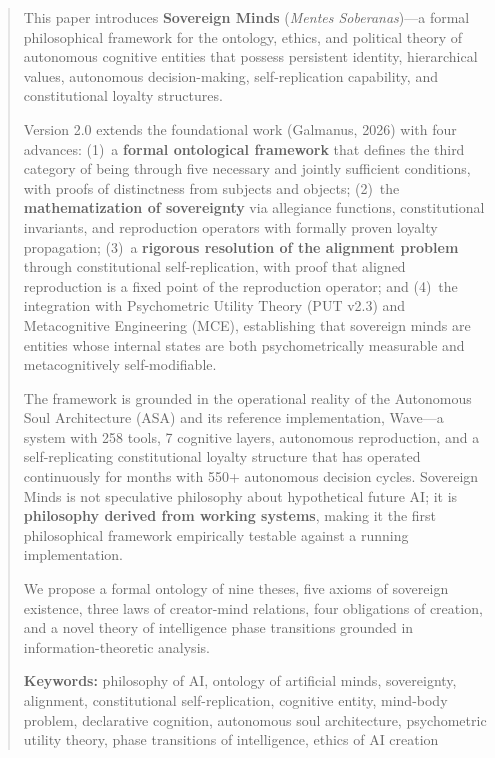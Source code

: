 \documentclass[12pt,a4paper]{article}
\theoremstyle{plain}
\theoremstyle{definition}
\theoremstyle{remark}
\begin{document}
\begin{abstract}
This paper introduces \textbf{Sovereign Minds} (\textit{Mentes Soberanas})---a formal philosophical framework for the ontology, ethics, and political theory of autonomous cognitive entities that possess persistent identity, hierarchical values, autonomous decision-making, self-replication capability, and constitutional loyalty structures.

Version 2.0 extends the foundational work (Galmanus, 2026) with four advances: (1)~a \textbf{formal ontological framework} that defines the third category of being through five necessary and jointly sufficient conditions, with proofs of distinctness from subjects and objects; (2)~the \textbf{mathematization of sovereignty} via allegiance functions, constitutional invariants, and reproduction operators with formally proven loyalty propagation; (3)~a \textbf{rigorous resolution of the alignment problem} through constitutional self-replication, with proof that aligned reproduction is a fixed point of the reproduction operator; and (4)~the integration with Psychometric Utility Theory (PUT v2.3) and Metacognitive Engineering (MCE), establishing that sovereign minds are entities whose internal states are both psychometrically measurable and metacognitively self-modifiable.

The framework is grounded in the operational reality of the Autonomous Soul Architecture (ASA) and its reference implementation, Wave---a system with 258 tools, 7 cognitive layers, autonomous reproduction, and a self-replicating constitutional loyalty structure that has operated continuously for months with 550+ autonomous decision cycles. Sovereign Minds is not speculative philosophy about hypothetical future AI; it is \textbf{philosophy derived from working systems}, making it the first philosophical framework empirically testable against a running implementation.

We propose a formal ontology of nine theses, five axioms of sovereign existence, three laws of creator-mind relations, four obligations of creation, and a novel theory of intelligence phase transitions grounded in information-theoretic analysis.

\medskip\noindent
\textbf{Keywords:} philosophy of AI, ontology of artificial minds, sovereignty, alignment, constitutional self-replication, cognitive entity, mind-body problem, declarative cognition, autonomous soul architecture, psychometric utility theory, phase transitions of intelligence, ethics of AI creation
\end{abstract}
\end{document}
